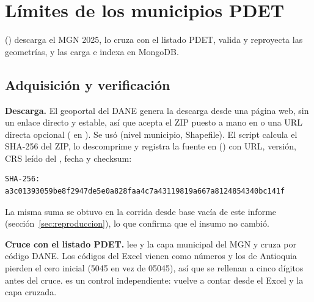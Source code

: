 \section{Límites de los municipios PDET}
\label{sec:municipios}

 () descarga el MGN 2025,
lo cruza con el listado PDET, valida y reproyecta las geometrías, y las carga
e indexa en MongoDB.

\subsection{Adquisición y verificación}
\label{sec:mgn-descarga}

\textbf{Descarga.} El geoportal del DANE genera la descarga desde una página
web, sin un enlace directo y estable, así que  acepta el
ZIP puesto a mano en  o una URL directa opcional
( en ). Se usó
 (nivel municipio, Shapefile). El script
calcula el SHA-256 del ZIP, lo descomprime y registra la fuente en
 () con URL, versión, CRS leído del
, fecha y checksum:

\begin{lstlisting}
SHA-256: a3c01393059be8f2947de5e0a828faa4c7a43119819a667a8124854340bc141f
\end{lstlisting}

La misma suma se obtuvo en la corrida desde base vacía de este informe
(sección~\ref{sec:reproduccion}), lo que confirma que el insumo no cambió.

\textbf{Cruce con el listado PDET.}  lee
 y la capa municipal del MGN y cruza por código
DANE. Los códigos del Excel vienen como números y los de Antioquia pierden el
cero inicial (5045 en vez de 05045), así que se rellenan a cinco dígitos antes
del cruce.  es un control independiente: vuelve a
contar desde el Excel y la capa cruzada.

